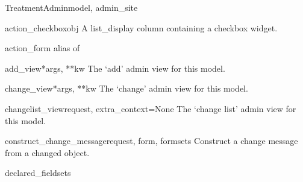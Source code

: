 \documentclass[letterpaper,10pt,english]{sphinxmanual}
\begin{document}
\hypertarget{data.admin.TreatmentAdmin}{}\begin{classdesc}{TreatmentAdmin}{model, admin\_site}~

\hypertarget{data.admin.TreatmentAdmin.action_checkbox}{}\begin{methoddesc}{action\_checkbox}{obj}
A list\_display column containing a checkbox widget.
\end{methoddesc}

\hypertarget{data.admin.TreatmentAdmin.action_form}{}\begin{memberdesc}{action\_form}
alias of 
\end{memberdesc}

\hypertarget{data.admin.TreatmentAdmin.add_view}{}\begin{methoddesc}{add\_view}{*args, **kw}
The `add' admin view for this model.
\end{methoddesc}

\hypertarget{data.admin.TreatmentAdmin.change_view}{}\begin{methoddesc}{change\_view}{*args, **kw}
The `change' admin view for this model.
\end{methoddesc}

\hypertarget{data.admin.TreatmentAdmin.changelist_view}{}\begin{methoddesc}{changelist\_view}{request, extra\_context=None}
The `change list' admin view for this model.
\end{methoddesc}

\hypertarget{data.admin.TreatmentAdmin.construct_change_message}{}\begin{methoddesc}{construct\_change\_message}{request, form, formsets}
Construct a change message from a changed object.
\end{methoddesc}

\hypertarget{data.admin.TreatmentAdmin.declared_fieldsets}{}\begin{memberdesc}{declared\_fieldsets}\end{memberdesc}


\end{classdesc}
\end{document}
